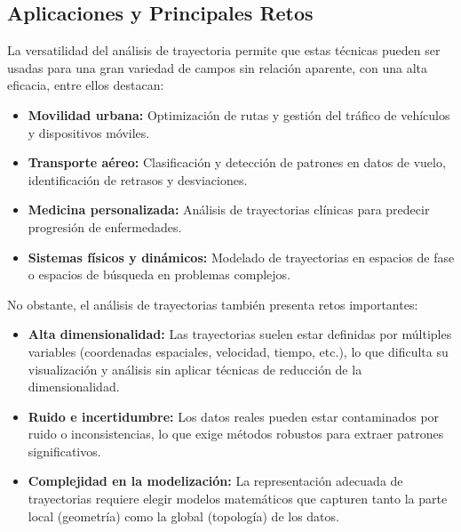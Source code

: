 \vspace{0.1cm}

\subsection{Aplicaciones y Principales Retos}

La versatilidad del análisis de trayectoria permite que estas técnicas pueden ser usadas para una gran variedad de campos sin relación aparente, con una alta eficacia, entre ellos destacan:

\begin{itemize}
    \item \textbf{Movilidad urbana:} Optimización de rutas y gestión del tráfico de vehículos y dispositivos móviles. \cite{lamosa2021topological}
    \item \textbf{Transporte aéreo:} Clasificación y detección de patrones en datos de vuelo, identificación de retrasos y desviaciones.\cite{airtraffic2025} \cite{espinoza2022tda_air}
    \item \textbf{Medicina personalizada:} Análisis de trayectorias clínicas para predecir progresión de enfermedades. \cite{bosoni2024predicting} \cite{shaikhina2020tda}
    \item \textbf{Sistemas físicos y dinámicos:} Modelado de trayectorias en espacios de fase o espacios de búsqueda en problemas complejos. \cite{garland2021tda_dynamics}
\end{itemize}

No obstante, el análisis de trayectorias también presenta retos importantes:

\begin{itemize}
    \item \textbf{Alta dimensionalidad:} Las trayectorias suelen estar definidas por múltiples variables (coordenadas espaciales, velocidad, tiempo, etc.), lo que dificulta su visualización y análisis sin aplicar técnicas de reducción de la dimensionalidad.
    \item \textbf{Ruido e incertidumbre:} Los datos reales pueden estar contaminados por ruido o inconsistencias, lo que exige métodos robustos para extraer patrones significativos.
    \item \textbf{Complejidad en la modelización:} La representación adecuada de trayectorias requiere elegir modelos matemáticos que capturen tanto la parte local (geometría) como la global (topología) de los datos.
\end{itemize}

